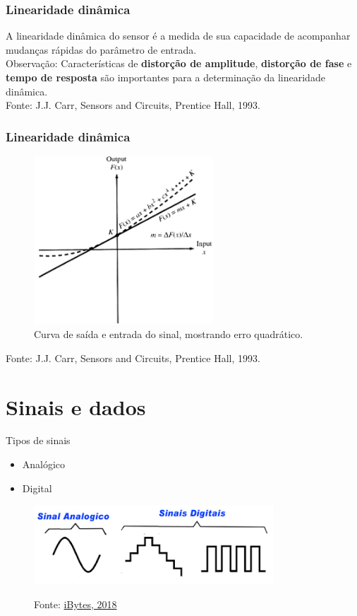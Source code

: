\documentclass[t]{beamer}
\begin{document}
\begin{frame}
	\frametitle{Linearidade dinâmica}
	A linearidade dinâmica do sensor é a medida de sua capacidade de acompanhar mudanças rápidas do parâmetro de entrada.\\
	\bigskip
	Observação:	Características de \textbf{distorção de amplitude}, \textbf{distorção de fase} e \textbf{tempo de resposta} são importantes para a determinação da linearidade dinâmica.\\
	\bigskip
	{\scriptsize Fonte: J.J. Carr, Sensors and Circuits, Prentice Hall, 1993.}
\end{frame}

\begin{frame}
	\frametitle{Linearidade dinâmica}
	\begin{figure}
		\includegraphics[width=0.6\textwidth]{linearidadedinamicaerroquadratico}
		\caption{Curva de saída e entrada do sinal, mostrando erro quadrático.}
	\end{figure}  	
	{\scriptsize Fonte: J.J. Carr, Sensors and Circuits, Prentice Hall, 1993.}
\end{frame}


\section{Sinais e dados}

\begin{frame}{Tipos de sinais}
	\begin{itemize}
		\item Analógico
		\item Digital
	\end{itemize}
	\begin{figure}
		\includegraphics[width=0.8\textwidth]{analogicodigital}
		
		{\scriptsize Fonte: \href{http://www.ibytes.com.br/as-diferencas-entre-eletronica-analogica-e-eletronica-digital/}{iBytes, 2018}}
	\end{figure}	
\end{frame}
\end{document}
